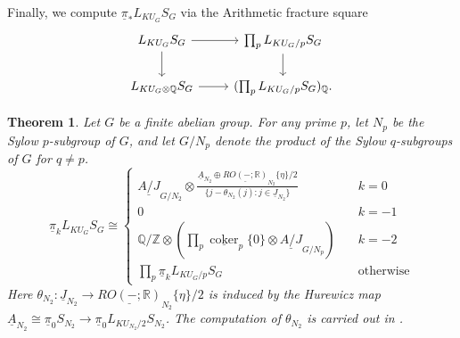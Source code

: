 \documentclass{amsart}
\theoremstyle{plain}
\newtheorem{theorem}{Theorem}[section]
\theoremstyle{definition}
\theoremstyle{remark}
\begin{document}
    Finally, we compute $\underline{\pi}_*L_{KU_G}S_G$ via the Arithmetic fracture square
    \[\begin{tikzcd}[ampersand replacement=\&]
        L_{KU_G}S_G  \ar[r] \ar[d] \& \prod_{p} L_{KU_G/p} S_G \ar[d] \\
        L_{KU_G\otimes\mathbb{Q}} S_G \ar[r] \& (\prod_{p} L_{KU_G/p}S_G)_{\mathbb{Q}} .
    \end{tikzcd}\]
    
\begin{theorem}\label{thm:integer graded homotopy Mackey functor of ku local sphere}
	Let $G$ be a finite abelian group. For any prime $p$, let $N_p$ be the Sylow $p$-subgroup of $G$, and let $G/N_p$ denote the product of the Sylow $q$-subgroups of $G$ for $q\neq p$.
    \[
	\underline{\pi}_kL_{KU_G}S_G\cong \begin{cases}
		\underline{A/J}_{G/N_2} \otimes  \frac{\underline{A}_{N_2} \oplus \underline{RO(-;\mathbb{R})}_{N_2}\{\eta\}/2}{\{j-\theta_{N_2}(j):j\in \underline{J}_{N_2}\}} & \quad k=0\\
		0 & \quad k=-1\\
		\mathbb{Q}/\mathbb{Z}\otimes (\prod_p \underline{\operatorname{coker}}_p\{0\}\otimes \underline{A/J}_{G/N_p}) & \quad k=-2\\
		\prod_p \underline{\pi}_kL_{KU_G/p}S_G & \quad \text{otherwise}
	\end{cases}
	\]
    Here $\theta_{N_2}:\underline{J}_{N_2} \to \underline{RO(-;\mathbb{R})}_{N_2}\{\eta\}/2$ is induced by the Hurewicz map $\underline{A}_{N_2}\cong \underline{\pi}_0 S_{N_2}\to \underline{\pi}_0 L_{KU_{N_2}/2}S_{N_2}$. The computation of $\theta_{N_2}$ is carried out in .
\end{theorem}
\end{document}
